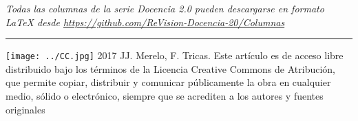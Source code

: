 \documentclass[twoside,10pt]{article}
\newcommand{\surl}[1]{{\small\url{#1}}}
\begin{document}
\begin{multicols}{2}
\medskip

\noindent\emph{Todas las columnas de la serie Docencia 2.0
pueden descargarse en formato LaTeX desde
\surl{https://github.com/ReVision-Docencia-20/Columnas}}

\noindent\rule{90mm}{1pt}

{\small \noindent\texttt{[image: ../CC.jpg]} 2017 JJ.
Merelo, F. Tricas. Este artículo es de acceso libre distribuido bajo
los términos
de la Licencia Creative Commons de Atribución, que permite copiar,
distribuir y comunicar públicamente la obra en cualquier medio, sólido
o electrónico, siempre que se acrediten a los autores y fuentes
originales}

\end{multicols}
\end{document}
